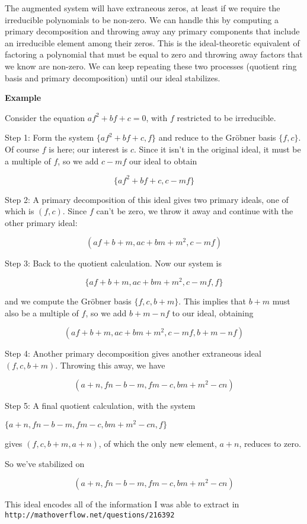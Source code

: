 \documentclass{article}
\begin{document}
The augmented system will have extraneous zeros, at least if we
require the irreducible polynomials to be non-zero.  We can handle
this by computing a primary decomposition and throwing away any
primary components that include an irreducible element among their
zeros.  This is the ideal-theoretic equivalent of factoring a
polynomial that must be equal to zero and throwing away factors that
we know are non-zero.  We can keep repeating these two processes
(quotient ring basis and primary decomposition) until our ideal
stabilizes.

{\bf Example}

Consider the equation $af^2+bf+c=0$, with $f$ restricted to be irreducible.

Step 1: Form the system $\{af^2+bf+c, f\}$ and reduce to the Gr\"obner
basis $\{f,c\}$.  Of course $f$ is here; our interest is $c$.  Since
it isn't in the original ideal, it must be a multiple of $f$, so we
add $c-mf$ our ideal to obtain

$$\{af^2+bf+c, c-mf\}$$

Step 2: A primary decomposition of this ideal gives two primary
ideals, one of which is $(f,c)$.  Since $f$ can't be zero, we throw it
away and continue with the other primary ideal:

$$(af+b+m, ac+bm+m^2, c-mf)$$

Step 3: Back to the quotient calculation.  Now our system is

$$\{af+b+m, ac+bm+m^2, c-mf, f\}$$

and we compute the Gr\"obner basis $\{f, c, b+m\}$.  This implies that
$b+m$ must also be a multiple of $f$, so we add $b+m-nf$ to our ideal,
obtaining

$$(af+b+m, ac+bm+m^2, c-mf, b+m-nf)$$

Step 4: Another primary decomposition gives another extraneous ideal
$(f,c,b+m)$.  Throwing this away, we have

$$(a+n, fn-b-m, fm-c, bm+m^2-cn)$$

Step 5: A final quotient calculation, with the system

$\{a+n, fn-b-m, fm-c, bm+m^2-cn, f\}$

gives $(f,c,b+m,a+n)$, of which the only new element, $a+n$, reduces
to zero.

So we've stabilized on 

$$(a+n, fn-b-m, fm-c, bm+m^2-cn)$$

This ideal encodes all of the information I was able to extract in
{\tt http://mathoverflow.net/questions/216392}
\end{document}
